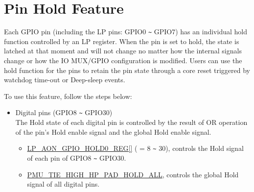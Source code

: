 \documentclass[main\_\_EN.tex]{subfiles}
\begin{document}
\section{Pin Hold Feature}\label{PadHold}

Each GPIO pin (including the LP pins: GPIO0 \verb+~+ GPIO7) has an individual hold function controlled by an LP register. When the pin is set to hold, the state is latched at that moment and will not change no matter how the internal signals change or how the IO MUX/GPIO configuration is modified. Users can use the hold function for the pins to retain the pin state through a core reset triggered by watchdog time-out or Deep-sleep events.

To use this feature, follow the steps below:

\begin{itemize}
\item Digital pins (GPIO8 \verb+~+ GPIO30)\\
The Hold state of each digital pin is controlled by the result of OR operation of the pin's Hold enable signal and the global Hold enable signal.
\begin{itemize}
    \item \hyperref[regdesc:LPAONGPIOHOLD0REG]{LP\_AON\_GPIO\_HOLD0\_REG[]} ( = 8 \verb+~+ 30), controls the Hold signal of each pin of GPIO8 \verb+~+ GPIO30.
    \item \hyperref[fielddesc:PMUTIEHIGHHPPADHOLDALL]{PMU\_TIE\_HIGH\_HP\_PAD\_HOLD\_ALL}, controls the global Hold signal of all digital pins.
\end{itemize}


\end{itemize}
\end{document}

